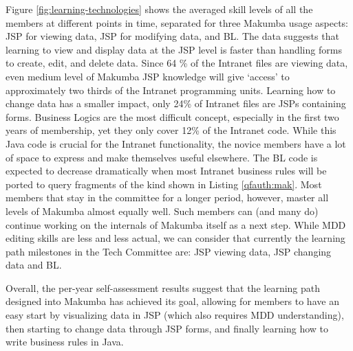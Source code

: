 \documentclass{chi2009}
\begin{document}
Figure \ref{fig:learning-technologies} shows the averaged skill levels of all the members at different points in time, separated for three Makumba usage aspects: JSP for viewing data, JSP for modifying data, and BL. The data suggests that learning to view and display data at the JSP level is faster than handling forms to create, edit, and delete data. 
Since 64 \% of the Intranet files are viewing data, even medium level of Makumba JSP knowledge will give `access' to approximately two thirds of the Intranet programming units. 
Learning how to change data has a smaller impact, only 24\% of Intranet files are JSPs containing forms. 
Business Logics are the most difficult concept, especially in the first two years of membership, yet they only cover 12\% of the Intranet code. While this Java code is crucial for the Intranet functionality, the novice members have a lot of space to express and make themselves useful elsewhere. The BL code is expected to decrease dramatically when most Intranet business rules will be ported to query fragments of the kind shown in Listing \ref{qfauth:mak}.
Most members that stay in the committee for a longer period, however, master all levels of Makumba almost equally well. Such members can (and many do) continue working on the internals of Makumba itself  as a next step. While MDD editing skills are less and less actual, we can consider that currently the learning path milestones in the Tech Committee are: JSP viewing data, JSP changing data and BL.

Overall, the per-year self-assessment results suggest that the learning path designed into Makumba has achieved its goal, allowing for members to have an easy start by visualizing data in JSP (which also requires MDD understanding), then starting to change data through JSP forms, and finally learning how to write business rules in Java.
\end{document}
